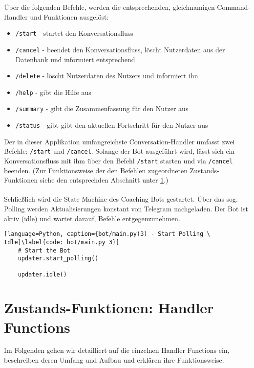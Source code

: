         Über die folgenden Befehle, werden die entsprechenden, gleichnamigen Command-Handler und Funktionen ausgelöst: 
        \begin{itemize}
            \item \verb|/start| - startet den Konversationsfluss
            \item \verb|/cancel| - beendet den Konversationsfluss, löscht Nutzerdaten aus der Datenbank und informiert entsprechend
            \item \verb|/delete| - löscht Nutzerdaten des Nutzers und informiert ihn
            \item \verb|/help| - gibt die Hilfe aus
            \item \verb|/summary| - gibt die Zusammenfassung für den Nutzer aus
            \item \verb|/status| - gibt gibt den aktuellen Fortschritt für den Nutzer aus
        \end{itemize}
        Der in dieser Applikation umfangreichste Conversation-Handler umfasst zwei Befehle: \verb|/start| und \verb|/cancel|. Solange der Bot ausgeführt wird, lässt sich ein Konversationsfluss mit ihm über den Befehl \verb|/start| starten und via \verb|/cancel| beenden. (Zur Funktionsweise der den Befehlen zugeordneten Zustands-Funktionen siehe den entsprechden Abschnitt unter \ref{Implementierung: Handler Functions}.) \\ \\
        
        Schließlich wird die State Machine des Coaching Bots gestartet. Über das sog. Polling werden Aktualisierungen konstant von Telegram nachgeladen. Der Bot ist aktiv (idle) und wartet darauf, Befehle entgegenzunehmen.
        \begin{lstlisting}[language=Python, caption={bot/main.py(3) - Start Polling \ Idle}\label{code: bot/main.py 3}]
    # Start the Bot
    updater.start_polling()

    updater.idle()
        \end{lstlisting}


    \section{Zustands-Funktionen: Handler Functions} \label{Implementierung: Handler Functions}
        Im Folgenden gehen wir detailliert auf die einzelnen Handler Functions ein, beschreiben deren Umfang und Aufbau und erklären ihre Funktionsweise. 

